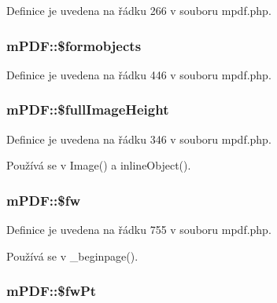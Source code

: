 Definice je uvedena na řádku 266 v souboru mpdf.\-php.

\hypertarget{classm_p_d_f_ad1d7801e8914624de778293a89756823}{
\subsubsection[{\$formobjects}]{\setlength{\rightskip}{0pt plus 5cm}m\-P\-D\-F\-::\$formobjects}}\label{classm_p_d_f_ad1d7801e8914624de778293a89756823}


Definice je uvedena na řádku 446 v souboru mpdf.\-php.

\hypertarget{classm_p_d_f_a1fe2deb0cd7e09e31e3c04772109781f}{
\subsubsection[{\$full\-Image\-Height}]{\setlength{\rightskip}{0pt plus 5cm}m\-P\-D\-F\-::\$full\-Image\-Height}}\label{classm_p_d_f_a1fe2deb0cd7e09e31e3c04772109781f}


Definice je uvedena na řádku 346 v souboru mpdf.\-php.



Používá se v Image() a inline\-Object().

\hypertarget{classm_p_d_f_a569446aa8f5003d72abad323118c18b0}{
\subsubsection[{\$fw}]{\setlength{\rightskip}{0pt plus 5cm}m\-P\-D\-F\-::\$fw}}\label{classm_p_d_f_a569446aa8f5003d72abad323118c18b0}


Definice je uvedena na řádku 755 v souboru mpdf.\-php.



Používá se v \-\_\-beginpage().

\hypertarget{classm_p_d_f_af9342529683da62d782ddfc28e2b92b4}{
\subsubsection[{\$fw\-Pt}]{\setlength{\rightskip}{0pt plus 5cm}m\-P\-D\-F\-::\$fw\-Pt}}\label{classm_p_d_f_af9342529683da62d782ddfc28e2b92b4}


